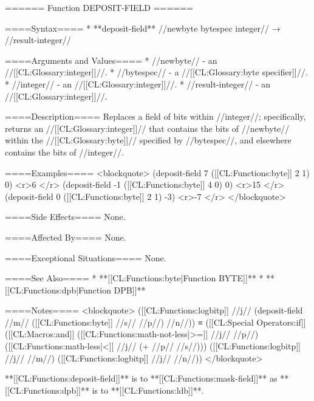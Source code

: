 ====== Function DEPOSIT-FIELD ======

====Syntax====
  * **deposit-field** //newbyte bytespec integer// → //result-integer//

====Arguments and Values====
  * //newbyte// - an //[[CL:Glossary:integer]]//.
  * //bytespec// - a //[[CL:Glossary:byte specifier]]//.
  * //integer// - an //[[CL:Glossary:integer]]//.
  * //result-integer// - an //[[CL:Glossary:integer]]//.

====Description====
Replaces a field of bits within //integer//; specifically, returns an //[[CL:Glossary:integer]]// that contains the bits of //newbyte// within the //[[CL:Glossary:byte]]// specified by //bytespec//, and elsewhere contains the bits of //integer//.

====Examples====
<blockquote>
(deposit-field 7 ([[CL:Functions:byte]] 2 1) 0) <r>6 </r>
(deposit-field -1 ([[CL:Functions:byte]] 4 0) 0) <r>15 </r>
(deposit-field 0 ([[CL:Functions:byte]] 2 1) -3) <r>-7 </r>
</blockquote>

====Side Effects====
None.

====Affected By====
None.

====Exceptional Situations====
None.

====See Also====
  * **[[CL:Functions:byte|Function BYTE]]**
  * **[[CL:Functions:dpb|Function DPB]]**

====Notes====
<blockquote> 
([[CL:Functions:logbitp]] //j// (deposit-field //m// ([[CL:Functions:byte]] //s// //p//) //n//)) 
  ≡ ([[CL:Special Operators:if]] ([[CL:Macros:and]] ([[CL:Functions:math-not-less|>=]] //j// //p//) 
             ([[CL:Functions:math-less|<]] //j// (+ //p// //s//)))
        ([[CL:Functions:logbitp]] //j// //m//) 
        ([[CL:Functions:logbitp]] //j// //n//))
</blockquote>

**[[CL:Functions:deposit-field]]** is to **[[CL:Functions:mask-field]]** as **[[CL:Functions:dpb]]** is to **[[CL:Functions:ldb]]**.

